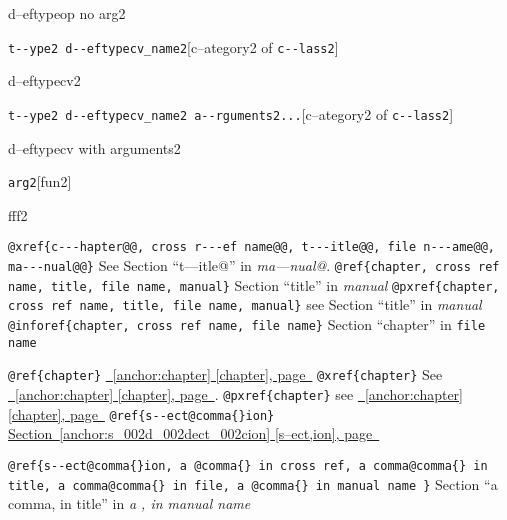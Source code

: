 \documentclass{book}
\begin{document}
\begin{titlepage}
%
d--eftypeop no arg2

\noindent\texttt{t{-}{-}ype2 d{-}{-}eftypecv\_name2}\hfill[c--ategory2 of \texttt{c{-}{-}lass2}]



%
d--eftypecv2

\noindent\texttt{t{-}{-}ype2 d{-}{-}eftypecv\_name2 a{-}{-}rguments2...}\hfill[c--ategory2 of \texttt{c{-}{-}lass2}]



%
d--eftypecv with arguments2

\noindent\texttt{arg2}\hfill[fun2]



%
fff2


\texttt{@xref\{c{-}{-}{-}hapter@@, cross r{-}{-}{-}ef name@@, t{-}{-}{-}itle@@, file n{-}{-}{-}ame@@, ma{-}{-}{-}nual@@\}} See Section ``t---itle@'' in \textsl{ma---nual@}.
\texttt{@ref\{chapter, cross ref name, title, file name, manual\}} Section ``title'' in \textsl{manual}
\texttt{@pxref\{chapter, cross ref name, title, file name, manual\}} see Section ``title'' in \textsl{manual}
\texttt{@inforef\{chapter, cross ref name, file name\}} Section ``chapter'' in \texttt{file name}

\texttt{@ref\{chapter\}} \hyperref[anchor:chapter]{\chaptername~\ref*{anchor:chapter} [chapter], page~\pageref*{anchor:chapter}}
\texttt{@xref\{chapter\}} See \hyperref[anchor:chapter]{\chaptername~\ref*{anchor:chapter} [chapter], page~\pageref*{anchor:chapter}}.
\texttt{@pxref\{chapter\}} see \hyperref[anchor:chapter]{\chaptername~\ref*{anchor:chapter} [chapter], page~\pageref*{anchor:chapter}}
\texttt{@ref\{s{-}{-}ect@comma\{\}ion\}} \hyperref[anchor:s_002d_002dect_002cion]{Section~\ref*{anchor:s_002d_002dect_002cion} [s--ect,ion], page~\pageref*{anchor:s_002d_002dect_002cion}}

\texttt{@ref\{s{-}{-}ect@comma\{\}ion, a @comma\{\} in cross
ref, a comma@comma\{\} in title, a comma@comma\{\} in file, a @comma\{\} in manual name \}}
Section ``a comma, in title'' in \textsl{a , in manual name}


\end{titlepage}
\end{document}
